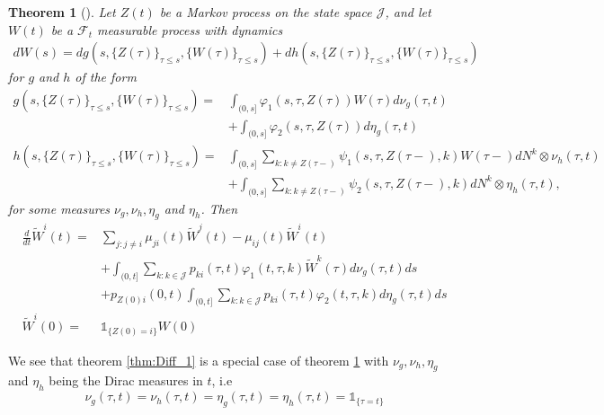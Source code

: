 \documentclass[12pt]{article}
\newcommand{\indic}[1]{\mathds{1}_{ \{ #1 \} }}
\theoremstyle{my_thm}
\newtheorem{thm}{Theorem}[section]
\begin{document}
\begin{thm}[]
\label{thm:Diff_2}
Let $Z(t)$ be a Markov process on the state space $\mathcal{J}$, and let $W(t)$ be a $\mathcal{F}_t$ measurable process with dynamics
\begin{align*}
dW(s)= d g(s,\{Z(\tau)\}_{\tau\leq s},\{W(\tau)\}_{\tau\leq s})+
 d h(s,\{Z(\tau)\}_{\tau\leq s},\{W(\tau)\}_{\tau\leq s})
\end{align*}
for $g$ and $h$ of the form
\begin{align*}
g(s,\{Z(\tau)\}_{\tau\leq s},\{W(\tau)\}_{\tau\leq s})=&\int_{(0,s]} \varphi_1(s,\tau,Z(\tau))W(\tau) d\nu_g(\tau,t)
\\
&+
\int_{(0,s]} \varphi_2(s,\tau,Z(\tau)) d\eta_g(\tau,t)
\\
h(s,\{Z(\tau)\}_{\tau\leq s},\{W(\tau)\}_{\tau\leq s})=&\int_{(0,s]} \sum_{k:k\neq Z(\tau-)} \psi_1(s,\tau,Z(\tau-),k) W(\tau-)  dN^k\otimes\nu_h(\tau,t)
\\
&+
\int_{(0,s]} \sum_{k:k\neq Z(\tau-)} \psi_2(s,\tau,Z(\tau-),k)  dN^k\otimes\eta_h(\tau,t),
\end{align*}
for some measures $\nu_g,\nu_h,\eta_g$ and $\eta_h$.
Then
\begin{align*}
\frac{d}{dt}\tilde{W}^i(t)=&
\sum_{j:j \neq i} \mu_{ji}(t) \tilde{W}^j(t)-\mu_{ij}(t)\tilde{W}^i(t)
\\
&+
\int_{(0,t]} \sum_{k:k \in \mathcal{J}} p_{ki}(\tau,t) \varphi_1(t,\tau,k) \tilde{W}^k(\tau) d\nu_g(\tau,t) ds
\\
&+
p_{Z(0)i}(0,t)\int_{(0,t]} \sum_{k:k \in \mathcal{J}} p_{ki}(\tau,t) \varphi_2(t,\tau,k) d\eta_g(\tau,t) ds
\\
\tilde{W}^i(0)=&\indic{Z(0)=i}W(0)
\end{align*}

\end{thm}
We see that theorem \ref{thm:Diff_1} is a special case of theorem \ref{thm:Diff_2} with $\nu_g,\nu_h,\eta_g$ and $\eta_h$ being the Dirac measures in $t$, i.e 
$$
\nu_g(\tau,t)=\nu_h(\tau,t)=\eta_g(\tau,t)=\eta_h(\tau,t)=\indic{\tau=t}
$$
\end{document}

